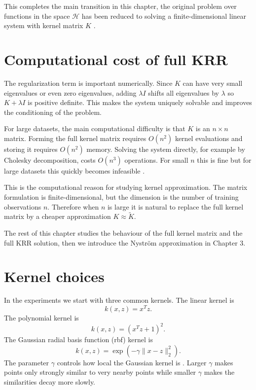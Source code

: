 This completes the main transition in this chapter, the original problem over functions in the space $\mathcal H$ has been reduced to solving a finite-dimensional linear system with kernel matrix $K$ \citep{saunders1998ridge,alaoui2015fast}.

\section{Computational cost of full KRR}

The regularization term is important numerically. Since $K$ can have very small eigenvalues or even zero eigenvalues, adding $\lambda I$ shifts all eigenvalues by $\lambda$ so $K+\lambda I$ is positive definite. This makes the system uniquely solvable and improves the conditioning of the problem.

For large datasets, the main computational difficulty is that $K$ is an $n\times n$ matrix. Forming the full kernel matrix requires $O(n^2)$ kernel evaluations and storing it requires $O(n^2)$ memory. Solving the system directly, for example by Cholesky decomposition, costs $O(n^3)$ operations. For small $n$ this is fine but for large datasets this quickly becomes infeasible \citep{bach2013sharp,alaoui2015fast}.

This is the computational reason for studying kernel approximation. The matrix formulation is finite-dimensional, but the dimension is the number of training observations $n$. Therefore when $n$ is large it is natural to replace the full kernel matrix by a cheaper approximation $K\approx \widetilde K.$ 

The rest of this chapter studies the behaviour of the full kernel matrix and the full KRR solution, then we introduce the Nystr\"om approximation in Chapter 3.

\section{Kernel choices}

In the experiments we start with three common kernels. The linear kernel is
\[
k(x,z)=x^Tz.
\]
The polynomial kernel is
\[
k(x,z)=(x^Tz+1)^2.
\]
The Gaussian radial basis function (rbf) kernel is
\[
k(x,z)=\exp(-\gamma\|x-z\|_2^2).
\]
The parameter $\gamma$ controls how local the Gaussian kernel is \citep{hofmann2008kernel,zhu2023rkhs}. Larger $\gamma$ makes points only strongly similar to very nearby points while smaller $\gamma$ makes the similarities decay more slowly.

